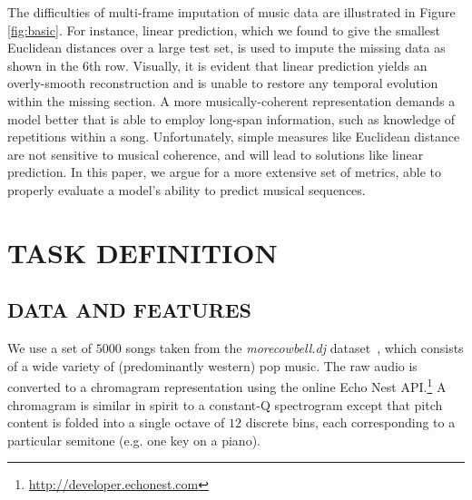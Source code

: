 \documentclass{article}
\begin{document}
The difficulties of multi-frame imputation of music data are 
illustrated in Figure \ref{fig:basic}.  For instance, linear prediction, which
we found to give the smallest Euclidean distances over a large 
test set, is used to impute the missing
data as shown in the $6$th row.%
Visually, it is evident that linear prediction
yields an overly-smooth reconstruction and is unable to restore any 
temporal evolution within the missing section.
%
A more musically-coherent representation demands a model better 
that is able to employ long-span information, 
such as knowledge of repetitions within a song. 
%
Unfortunately, simple measures like Euclidean distance are not 
sensitive to musical coherence, and will lead to solutions like 
linear prediction.  
%
In this paper, we argue for a more extensive set of metrics, able 
to properly evaluate a model's ability to predict musical sequences.


\section{TASK DEFINITION}
\label{sec:task}

\subsection{DATA AND FEATURES}
\label{ssec:feats}
We use a set of $5000$ songs taken
from the \emph{morecowbell.dj} dataset~\cite{Bertin-Mahieux2010a}, 
which consists of a wide variety of (predominantly western) pop
music.  The raw audio is converted to a chromagram
representation using the online Echo Nest
API.\footnote{\url{http://developer.echonest.com}} A chromagram is
similar in spirit to a \mbox{constant-Q} spectrogram except that pitch
content is folded into a single octave of $12$ discrete bins,
each corresponding to a particular semitone (e.g. one key on a piano).
%
\end{document}
